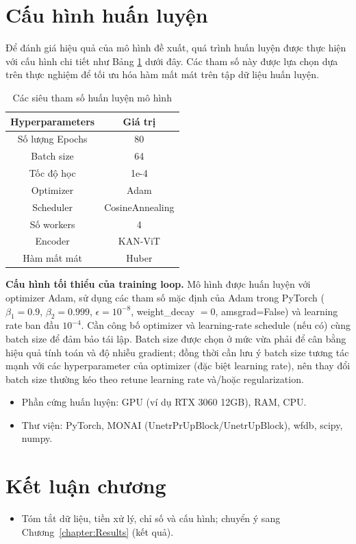 \documentclass[../DoAn.tex]{subfiles}
\begin{document}
\section{Cấu hình huấn luyện}

Để đánh giá hiệu quả của mô hình đề xuất, quá trình huấn luyện được thực hiện với cấu hình chi tiết như Bảng \ref{tab:hyper} dưới đây. Các tham số này được lựa chọn dựa trên thực nghiệm để tối ưu hóa hàm mất mát trên tập dữ liệu huấn luyện.

\begin{table}[htbp]
  \centering
  \caption{Các siêu tham số huấn luyện mô hình}
  \begin{tabular}{|c|c|}
    \hline
    \textbf{Hyperparameters} & \textbf{Giá trị}\\\hline
    Số lượng Epochs & 80    \\\hline
    Batch size & 64   \\\hline
    Tốc độ học & 1e-4 \\\hline
    Optimizer & Adam  \\\hline
    Scheduler & CosineAnnealing \\\hline
    Số workers & 4 \\\hline
    Encoder & KAN-ViT \\\hline
    Hàm mất mát & Huber  \\\hline
  \end{tabular}
  \label{tab:hyper}
\end{table}

\textbf{Cấu hình tối thiểu của training loop.}
Mô hình được huấn luyện với optimizer Adam, sử dụng các tham số mặc định của Adam trong PyTorch
($\beta_1=0.9$, $\beta_2=0.999$, $\epsilon=10^{-8}$, weight\_decay $=0$, amsgrad=False) và learning rate ban đầu
$10^{-4}$. Cần công bố optimizer và learning-rate schedule (nếu có) cùng batch size để đảm bảo tái lập.
Batch size được chọn ở mức vừa phải để cân bằng hiệu quả tính toán và độ nhiễu gradient; đồng thời cần lưu ý batch size
tương tác mạnh với các hyperparameter của optimizer (đặc biệt learning rate), nên thay đổi batch size thường kéo theo
retune learning rate và/hoặc regularization.

\begin{itemize}
  \item Phần cứng huấn luyện: GPU (ví dụ RTX 3060 12GB), RAM, CPU.
  \item Thư viện: PyTorch, MONAI (UnetrPrUpBlock/UnetrUpBlock), wfdb, scipy, numpy.
\end{itemize}

\section{Kết luận chương}
\begin{itemize}
  \item Tóm tắt dữ liệu, tiền xử lý, chỉ số và cấu hình; chuyển ý sang Chương~\ref{chapter:Results} (kết quả).
\end{itemize}
\end{document}
